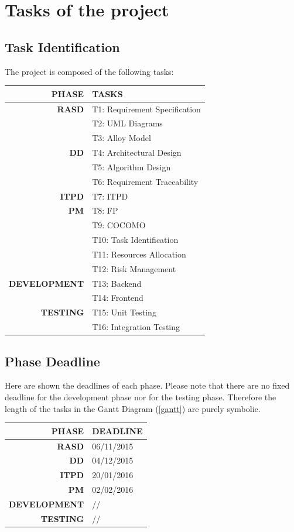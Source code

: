 \chapter{Tasks of the project}
\section{Task Identification}
The project is composed of the following tasks:

\begin{table}[H]
	\centering
	\begin{tabular}{ r | l } 
		\textbf{PHASE} & \textbf{TASKS} \\ \hline
		\textbf{RASD} & T1: Requirement Specification \\
					  & T2: UML Diagrams \\
			          & T3: Alloy Model \\ \hline
		\textbf{DD} & T4: Architectural Design \\
					& T5: Algorithm Design \\
					& T6: Requirement Traceability \\ \hline
		\textbf{ITPD} & T7: ITPD \\ \hline
		\textbf{PM} & T8: FP \\
					& T9: COCOMO \\
					& T10: Task Identification \\
					& T11: Resources Allocation \\
					& T12: Risk Management \\ \hline
		\textbf{DEVELOPMENT} & T13: Backend \\
							 & T14: Frontend \\ \hline
		\textbf{TESTING} & T15: Unit Testing \\
						 & T16: Integration Testing
	\end{tabular}
\end{table}

\pagebreak

\section{Phase Deadline}
Here are shown the deadlines of each phase. Please note that there are no fixed deadline for the development phase nor for the testing phase. Therefore the length of the tasks in the Gantt Diagram (\ref{gantt}) are purely symbolic.

\begin{table}[H]
	\centering
	\begin{tabular}{ r | l } 
		\textbf{PHASE} & \textbf{DEADLINE} \\ \hline
		\textbf{RASD} & 06/11/2015 \\
		\textbf{DD} & 04/12/2015 \\
		\textbf{ITPD} & 20/01/2016 \\
		\textbf{PM} & 02/02/2016 \\
		\textbf{DEVELOPMENT} & // \\
		\textbf{TESTING} & // \\
	\end{tabular}
\end{table}

